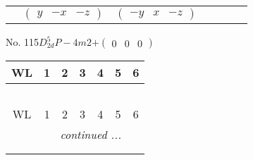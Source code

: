 \documentclass[fleqn,9pt,landscape]{jsarticle}
\begin{document}
\begin{center}
\begin{longtable}{ccccccc}
& $ \begin{pmatrix} y & - x & - z \end{pmatrix} $ & $ \begin{pmatrix} - y & x & - z \end{pmatrix} $ & $  $ & $  $ & $  $ & $  $ \\
\end{longtable}
\end{center}
\newpage
No. 115\quad$D_{2d}^{5}$\quad$P-4m2$\quad[ tetragonal ]\quad$+\begin{pmatrix} 0 & 0 & 0 \end{pmatrix}$
\begin{center}
\renewcommand{\arraystretch}{1.2}
\begin{longtable}{ccccccc}
 \hline \hline
WL & 1 & 2 & 3 & 4 & 5 & 6 \\ \hline \endfirsthead

\multicolumn{6}{l}{\tablename\ \thetable{}} \\
 \hline \hline
WL & 1 & 2 & 3 & 4 & 5 & 6 \\ \hline \endhead

 \hline \hline
\multicolumn{6}{r}{\footnotesize\it continued ...} \\ \endfoot

 \hline \hline
\multicolumn{6}{r}{} \\ \endlastfoot


\end{longtable}
\end{center}
\end{document}
